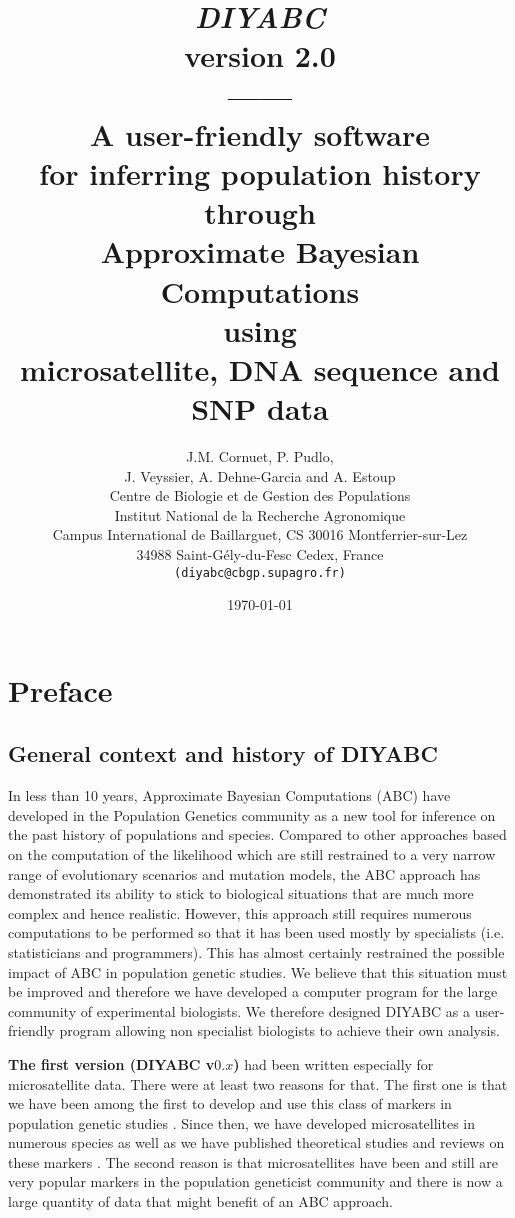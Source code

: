 \documentclass [a4paper]{report}
\title{\Huge \emph{\textbf{DIYABC}} \\ 
version 2.0\\
------\\ 
A user-friendly software \\  
for inferring population history  through \\ 
Approximate Bayesian Computations\\
using\\ 
microsatellite, DNA sequence and SNP data}
\author{
\Large J.M. Cornuet, P. Pudlo,\\ 
\Large J. Veyssier, A. Dehne-Garcia and A. Estoup\\
\vspace{6.0cm}
Centre de Biologie et de Gestion des Populations\\
Institut National de la Recherche Agronomique\\
Campus International de Baillarguet, CS 30016 Montferrier-sur-Lez\\
34988 Saint-G\'ely-du-Fesc Cedex, France\\
\texttt{(diyabc@cbgp.supagro.fr)}}
\date{\today}
\let\sectionv\section
\renewcommand{\section}[1]{\sectionv{#1} \setcounter{paragraph}{0}}
\let\subsectionv\subsection
\renewcommand{\subsection}[1]{\subsectionv{#1} \setcounter{paragraph}{0}}
\begin{document}
\maketitle %
\pagestyle{myheadings}
\begin{doublespacing}
\setcounter{tocdepth}{4}
\tableofcontents
\end{doublespacing}
\newpage
\section{Preface}
\subsection{General context and history of DIYABC}
In less than 10 years, Approximate Bayesian Computations (ABC) have developed in the Population Genetics community as a new tool for inference on the past history of populations and species. Compared to other approaches based on the computation of the likelihood which are still restrained to a very narrow range of evolutionary scenarios and mutation models, the ABC approach has demonstrated its ability to stick to biological situations that are much more complex and hence realistic. However, this approach still requires numerous computations to be performed so that it has been used mostly by specialists (i.e. statisticians and programmers). This has almost certainly restrained the possible impact of ABC in population genetic studies. We believe that this situation must be improved and therefore we have developed a computer program for the large community of experimental biologists. We therefore designed DIYABC as a user-friendly program allowing non specialist biologists to achieve their own analysis.\

\textbf{The first version (DIYABC v$0.x$)} had been written especially for microsatellite data. There were at least two reasons for that. The first one is that we have been among the first to develop and use this class of markers in population genetic studies \citep[e.g.][]{E1993}. Since then, we have developed microsatellites in numerous species as well as we have published theoretical studies and reviews on these markers \citep[e.g.][]{E2002}. The second reason is that microsatellites have been and still are very popular markers in the population geneticist community and there is now a large quantity of data that might benefit of an ABC approach.\
\end{document}
